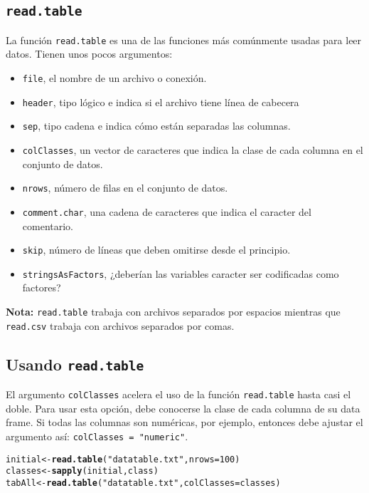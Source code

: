\documentclass{article}\usepackage[]{graphicx}\usepackage[]{color}
\makeatletter
\newcommand{\hlnum}[1]{\textcolor[rgb]{0.686,0.059,0.569}{#1}}%
\newcommand{\hlstr}[1]{\textcolor[rgb]{0.192,0.494,0.8}{#1}}%
\newcommand{\hlstd}[1]{\textcolor[rgb]{0.345,0.345,0.345}{#1}}%
\newcommand{\hlkwb}[1]{\textcolor[rgb]{0.69,0.353,0.396}{#1}}%
\newcommand{\hlkwc}[1]{\textcolor[rgb]{0.333,0.667,0.333}{#1}}%
\newcommand{\hlkwd}[1]{\textcolor[rgb]{0.737,0.353,0.396}{\textbf{#1}}}%
\newenvironment{kframe}{%
 \def\at@end@of@kframe{}%
 \ifinner\ifhmode%
  \def\at@end@of@kframe{\end{minipage}}%
  \begin{minipage}{\columnwidth}%
 \fi\fi%
 \def\FrameCommand##1{\hskip\@totalleftmargin \hskip-\fboxsep
 \colorbox{shadecolor}{##1}\hskip-\fboxsep
     \hskip-\linewidth \hskip-\@totalleftmargin \hskip\columnwidth}%
 \MakeFramed {\advance\hsize-\width
   \@totalleftmargin\z@ \linewidth\hsize
   \@setminipage}}%
 {\par\unskip\endMakeFramed%
 \at@end@of@kframe}
\newenvironment{knitrout}{}{} %
\makeatother
\begin{document}
  \subsection{\texttt{read.table}}
  La función \texttt{read.table} es una de las funciones más comúnmente usadas para leer datos. Tienen unos pocos argumentos:
  \begin{itemize}
    \item \texttt{file}, el nombre de un archivo o conexión.
    \item \texttt{header}, tipo lógico e indica si el archivo tiene línea de cabecera
    \item \texttt{sep}, tipo cadena e indica cómo están separadas las columnas.
    \item \texttt{colClasses}, un vector de caracteres que indica la clase de cada columna en el conjunto de datos.
    \item \texttt{nrows}, número de filas en el conjunto de datos.
    \item \texttt{comment.char}, una cadena de caracteres que indica el caracter del comentario.
    \item \texttt{skip}, número de líneas que deben omitirse desde el principio.
    \item \texttt{stringsAsFactors}, ¿deberían las variables caracter ser codificadas como factores?
\end{itemize}

\textbf{Nota:} \texttt{read.table} trabaja con archivos separados por espacios mientras que \texttt{read.csv} trabaja con archivos separados por comas.

  \subsection{Usando \texttt{read.table}}
  El argumento \texttt{colClasses} acelera el uso de la función \texttt{read.table} hasta casi el doble. Para usar esta opción, debe conocerse la clase de cada columna de su data frame. Si todas las columnas son numéricas, por ejemplo, entonces debe ajustar el argumento así: \texttt{colClasses = "numeric"}. 
\begin{knitrout}
\color{fgcolor}\begin{kframe}
\begin{alltt}
  \hlstd{initial} \hlkwb{<-} \hlkwd{read.table}\hlstd{(}\hlstr{"datatable.txt"}\hlstd{,} \hlkwc{nrows} \hlstd{=} \hlnum{100}\hlstd{)}
  \hlstd{classes} \hlkwb{<-} \hlkwd{sapply}\hlstd{(initial, class)}
  \hlstd{tabAll} \hlkwb{<-} \hlkwd{read.table} \hlstd{(}\hlstr{"datatable.txt"}\hlstd{,} \hlkwc{colClasses} \hlstd{= classes)}
\end{alltt}
\end{kframe}
\end{knitrout}
  
\end{document}
